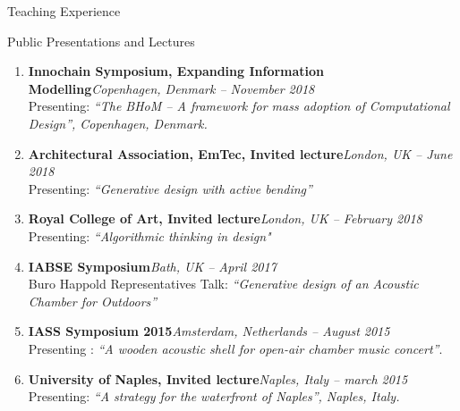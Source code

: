 \documentclass{resume}
\begin{document}
\begin{rSection}{Teaching Experience}
\end{rSection}

\begin{rSection}{Public Presentations and Lectures}
    \begin{enumerate}[leftmargin=0.45cm, itemsep=0em, topsep=0.5em, parsep=0.2em]
        \item \textbf{Innochain Symposium, Expanding Information Modelling}\hfill            \textit{Copenhagen, Denmark -- November 2018} \\
            Presenting: \textit{“The BHoM – A framework for mass adoption of Computational Design”, Copenhagen, Denmark.}

        \item \textbf{Architectural Association, EmTec, Invited lecture}\hfill             \textit{London, UK -- June 2018} \\
            Presenting: \textit{“Generative design with active bending”}

        \item \textbf{Royal College of Art, Invited lecture}\hfill \textit{London, UK -- February 2018} \\
            Presenting: \textit{“Algorithmic thinking in design"}

        \item \textbf{IABSE Symposium}\hfill \textit{Bath, UK -- April 2017} \\
            Buro Happold Representatives Talk: \textit{“Generative design of an Acoustic Chamber for Outdoors”}

        \item \textbf{IASS Symposium 2015}\hfill \textit{Amsterdam, Netherlands -- August 2015} \\
        Presenting : \textit{“A wooden acoustic shell for open-air chamber music concert”}.

        \item \textbf{University of Naples, Invited lecture}\hfill \textit{Naples, Italy -- march 2015} \\
    	Presenting: \textit{“A strategy for the waterfront of Naples”, Naples, Italy.}

    \end{enumerate}
\end{rSection}
\end{document}
